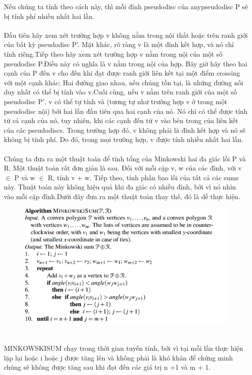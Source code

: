 \documentclass[a4paper,12pt]{report}
\begin{document}
Nếu chúng ta tính theo cách này, thì mỗi đỉnh pseudodisc của anypseudodisc P sẽ bị tính phí nhiều nhất hai lần. \\ \\
Đầu tiên hãy xem xét trường hợp v không nằm trong nội thất hoặc trên ranh giới của bất kỳ pseudodisc P'. Mặt khác, rõ ràng v là một đỉnh kết hợp, và nó chỉ tính riêng.Tiếp theo hãy xem xét trường hợp v nằm trong nội của một số pseudodisc P.Điều này có nghĩa là v nằm trong nội của hợp. Bây giờ hãy theo hai cạnh của P đến v cho đến khi đạt được ranh giới liên kết tại một điểm crossing với một cạnh khác; Hai đường giao nhau, nếu chúng tồn tại, là những đường nối duy nhất có thể bị tính vào v.Cuối cùng, nếu v nằm trên ranh giới của một số pseudodisc P', v có thể tự tính và (tương tự như trường hợp v ở trong một pseudodisc nội) bởi hai lần đầu tiên qua hai cạnh của nó. Nó chỉ có thể được tính từ cả cạnh của nó, tuy nhiên, khi các cạnh đến từ v vào bên trong của liên kết của các pseudodiscs. Trong trường hợp đó, v không phải là đỉnh kết hợp và nó sẽ không bị tính phí. Do đó, trong mọi trường hợp, v được tính nhiều nhất hai lần.  \\ \\
Chúng ta đưa ra một thuật toán để tính tổng của Minkowski hai đa giác lồi P và R. Một thuật toán rất đơn giản là sau. Đối với mỗi cặp v, w của các đỉnh, với v $\in$ P và w $\in$ R, tính v + w. Tiếp theo, tính phần bao lồi của tất cả các sums này. Thuật toán này không hiệu quả khi đa giác có nhiều đỉnh, bởi vì nó nhìn vào mỗi cặp đỉnh.Dưới đây đưa ra một thuật toán thay thế, đó là dễ thực hiện.\\
\begin{figure}[h]
\includegraphics[width=0.85\linewidth]{ag1.png}
\end{figure}
\\
MINKOWSKISUM chạy trong thời gian tuyến tính, bởi vì tại mỗi lần thực hiện lặp lại hoặc i hoặc j được tăng lên và không phải là khó khăn để chứng minh chúng sẽ không được tăng sau khi đạt đến các giá trị n +1 và m + 1.  \\ \\
\end{document}
